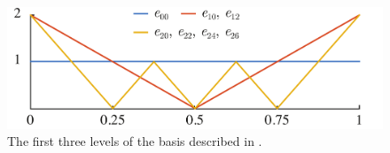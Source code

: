 \begin{figure}[t]
  \centering
  \includegraphics[width=1.0\columnwidth]{include/assets/figures/basis.pdf}
  \vspace{-1.5em}
  \caption{
    The first three levels of the basis described in .
  }
\end{figure}

